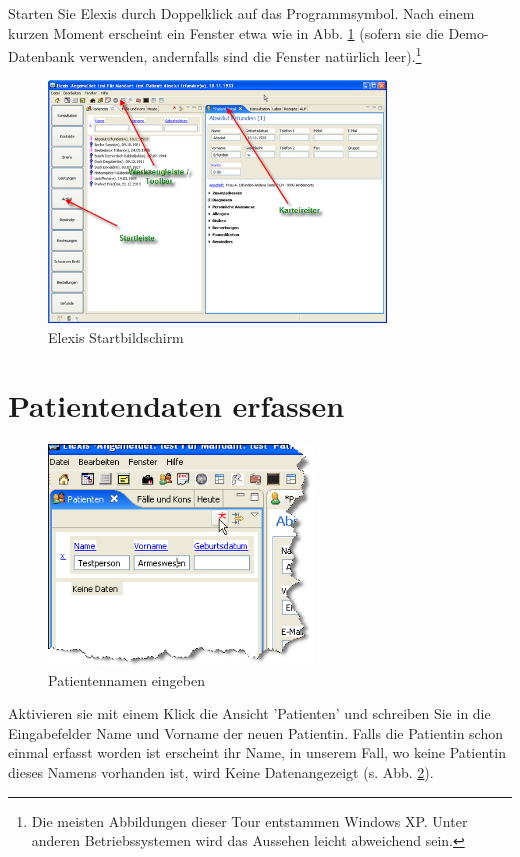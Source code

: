
Starten Sie Elexis durch Doppelklick auf das Programmsymbol.
Nach einem kurzen Moment erscheint ein Fenster etwa wie in Abb. \ref{fig:startbild} (sofern sie die
Demo-Datenbank verwenden, andernfalls sind die Fenster natürlich
leer).\footnote{Die meisten Abbildungen dieser Tour entstammen Windows XP. Unter anderen Betriebssystemen wird das Aussehen leicht abweichend sein.}
 \begin{figure}[ht]
	\includegraphics[width=0.8\textwidth]{images/einf0}
	\caption{Elexis Startbildschirm}
	\label{fig:startbild}
\end{figure}
\section{Patientendaten erfassen}
\begin{figure}
	\includegraphics[width=7cm]{images/einf1}
	\caption{Patientennamen eingeben}
	\label{fig:patname}
\end{figure}
Aktivieren sie mit einem Klick die Ansicht 'Patienten' und schreiben Sie in die Eingabefelder Name und Vorname der neuen Patientin.
Falls die Patientin schon einmal erfasst worden ist erscheint ihr Name, in unserem Fall, wo keine Patientin dieses Namens vorhanden ist, wird \glqq Keine Daten\grqq{}angezeigt (s. Abb. \ref{fig:patname}).

